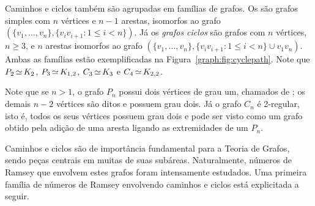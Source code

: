 Caminhos e ciclos também são agrupadas em famílias de grafos. Os  são grafos simples com $n$ vértices e $n-1$ arestas, isomorfos ao grafo $(\{v_1,\dots,v_n\}, \{v_iv_{i+1}: 1\leq i < n\})$. Já os \emph{grafos ciclos} são grafos com $n$ vértices, $n\geq 3$, e $n$ arestas isomorfos ao grafo $(\{v_1,\dots,v_n\}, \{v_iv_{i+1}: 1\leq i < n\} \cup v_1v_n)$. Ambas as famílias estão exemplificadas na Figura~\ref{graph:fig:cyclepath}.
Note que $P_2 \operatorname{\simeq} K_2$, $P_3 \operatorname{\simeq} K_{1,2}$, $C_3 \operatorname{\simeq} K_3$ e $C_4 \operatorname{\simeq} K_{2,2}$.

Note que se $n>1$, o grafo $P_n$ possui dois vértices de grau um, chamados de ; os demais $n-2$ vértices são ditos  e possuem grau dois. Já o grafo $C_n$ é 2-regular, isto é, todos os seus vértices possuem grau dois e pode ser visto como um grafo obtido pela adição de uma aresta ligando as extremidades de um $P_n$.

Caminhos e ciclos são de importância fundamental para a Teoria de Grafos, sendo peças centrais em muitas de suas subáreas. Naturalmente, números de Ramsey que envolvem estes grafos foram intensamente estudados. Uma primeira família de números de Ramsey envolvendo caminhos e ciclos está explicitada a seguir.

